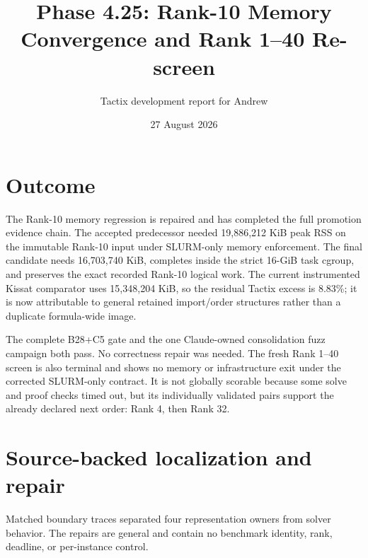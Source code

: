 \documentclass[11pt]{article}
\title{Phase 4.25: Rank-10 Memory Convergence and Rank 1--40 Re-screen}
\author{Tactix development report for Andrew}
\date{27 August 2026}
\begin{document}
\maketitle

\section{Outcome}

The Rank-10 memory regression is repaired and has completed the full promotion
evidence chain.  The accepted predecessor needed 19,886,212 KiB peak RSS on
the immutable Rank-10 input under SLURM-only memory enforcement.  The final
candidate needs 16,703,740 KiB, completes inside the strict 16-GiB task cgroup,
and preserves the exact recorded Rank-10 logical work.  The current
instrumented Kissat comparator uses 15,348,204 KiB, so the residual Tactix
excess is 8.83\%; it is now attributable to general retained import/order
structures rather than a duplicate formula-wide image.

The complete B28+C5 gate and the one Claude-owned consolidation fuzz campaign
both pass.  No correctness repair was needed.  The fresh Rank 1--40 screen is
also terminal and shows no memory or infrastructure exit under the corrected
SLURM-only contract.  It is not globally scorable because some solve and proof
checks timed out, but its individually validated pairs support the already
declared next order: Rank 4, then Rank 32.

\section{Source-backed localization and repair}

Matched boundary traces separated four representation owners from solver
behavior.  The repairs are general and contain no benchmark identity, rank,
deadline, or per-instance control.
\end{document}
